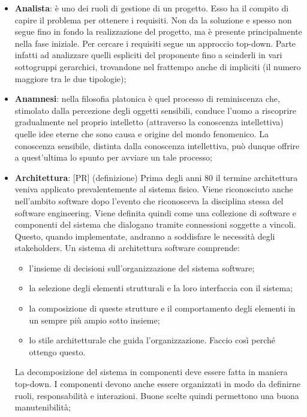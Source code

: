 \begin{itemize}
	\item \textbf{Analista}: è uno dei ruoli di gestione di un progetto. Esso ha il compito di capire il problema per ottenere i requisiti. Non da la soluzione e spesso non segue fino in fondo la realizzazione del progetto, ma è presente principalmente nella fase iniziale. \newline
	Per cercare i requisiti segue un approccio top-down. Parte infatti ad analizzare quelli espliciti del proponente fino a scinderli in vari sottogruppi gerarchici, trovandone nel frattempo anche di impliciti (il numero maggiore tra le due tipologie);

	\item \textbf{Anamnesi}: nella filosofia platonica è quel processo di reminiscenza che, stimolato dalla percezione degli oggetti sensibili, conduce l'uomo a riscoprire gradualmente nel proprio intelletto (attraverso la conoscenza intellettiva) quelle idee eterne che sono causa e origine del mondo fenomenico. La conoscenza sensibile, distinta dalla conoscenza intellettiva, può dunque offrire a quest'ultima lo spunto per avviare un tale processo;

	\item \textbf{Architettura}: [PR] (definizione) Prima degli anni 80 il termine architettura veniva applicato prevalentemente al sistema fisico. Viene riconosciuto anche nell'ambito software dopo l'evento che riconosceva la disciplina stessa del software engineering. \newline
	Viene definita quindi come una collezione di software e componenti del sistema che dialogano tramite connessioni soggette a vincoli. Questo, quando implementate, andranno a soddisfare le necessità degli stakeholders. Un sistema di architettura software comprende:
		\begin{itemize}
			\item l'insieme di decisioni sull'organizzazione del sistema software;
			\item la selezione degli elementi strutturali e la loro interfaccia con il sistema;
			\item la composizione di queste strutture e il comportamento degli elementi in un sempre più ampio sotto insieme;
			\item lo stile architetturale che guida l'organizzazione. Faccio così perché ottengo questo.
		\end{itemize}
		\noindent
	La decomposizione del sistema in componenti deve essere fatta in maniera top-down. I componenti devono anche essere organizzati in modo da definirne ruoli, responsabilità e interazioni. Buone scelte quindi permettono una buona manutenibilità;


\end{itemize}
